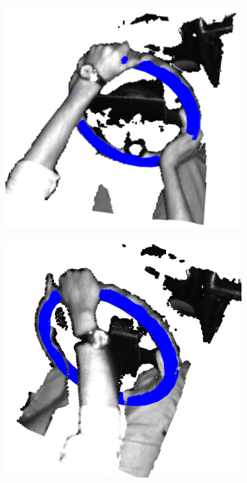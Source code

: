 \begin{figure}[ht]
\begin{subfigure}[t]{0.3\textwidth}
    \end{subfigure}\\
    \begin{subfigure}[t]{0.3\textwidth}
        \centering
        \includegraphics[width=\textwidth]{media/chapter 3/torus4.png}
    \end{subfigure}\hfill
    \begin{subfigure}[t]{0.3\textwidth}
        \centering
        \includegraphics[width=\textwidth]{media/chapter 3/torus5.png}

\end{subfigure}
\end{figure}
